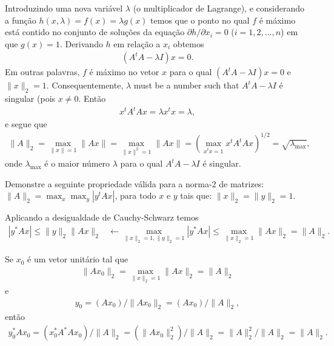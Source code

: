 \begin{questions}
\begin{solution}
        Introduzindo uma nova vari\'{a}vel $\lambda$ (o multiplicador de Lagrange), e considerando a fun\c{c}\~{a}o $h(x, \lambda) = f(x) = \lambda g(x)$ temos que o ponto no qual $f$ \'{e} m\'{a}ximo est\'{a} contido no conjunto de solu\c{c}\~{o}es da equa\c{c}\~{a}o $\partial h / \partial x_i = 0$ ($i = 1, 2, \ldots, n$) em que $g(x) = 1$. Derivando $h$ em rela\c{c}\~{a}o a $x_i$ obtemos
        \begin{align*}
            \left( A^t A - \lambda I \right) x = 0.
        \end{align*}
        Em outras palavras, $f$ \'{e} m\'{a}ximo no vetor $x$ para o qual $\left( A^t A - \lambda I \right) x = 0$  e $\| x \|_2 = 1$. Consequentemente, $\lambda$ must be a number such that $A^t A - \lambda I$ \'{e} singular (pois $x \neq 0$. Ent\~{a}o
        \begin{align*}
            x^t A^t A x = \lambda x^t x = \lambda,
        \end{align*}
        e segue que
        \begin{align*}
            \| A \|_2 = \max_{\| x \| = 1} \| A x \| = \max_{\| x \|^2 = 1} \| A x \| = \left( \max_{x^t x = 1} x^t A^t A x \right)^{1 / 2} = \sqrt{\lambda_{\max}},
        \end{align*}
        onde $\lambda_{\max}$ \'{e} o maior n\'{u}mero $\lambda$ para o qual $A^t A - \lambda I$ \'{e} singular.
    \end{solution}

     Demonstre a seguinte propriedade v\'{a}lida para a norma-2 de matrizes: $\| A \|_2 = \max_x \max_y | y^t A x |$, para todo $x$ e $y$ tais que: $\| x \|_2 = \| y \|_2 = 1$.
    \begin{solution}
        Aplicando a desigualdade de Cauchy-Schwarz temos
        \begin{align*}
            | y^* A x | \leq \| y \|_2 \| A x \|_2 &\leftarrow \max_{\| x \|_2 = 1, \| y \|_2 = 1} | y^* A x | \leq \max_{\| x \|_2 = 1} \| A x \|_2 = \| A \|_2.
        \end{align*}

        Se $x_0$ \'{e} um vetor unit\'{a}rio tal que
        \begin{align*}
            \| A x_0 \|_2 = \max_{\| x \|_2 = 1} \| A x \|_2 = \| A \|_2
        \end{align*}
        e
        \begin{align*}
            y_0 = \left( A x_0 \right) / \| A x_0 \|_2 = \left( A x_0 \right) / \| A \|_2,
        \end{align*}
        ent\~{a}o
        \begin{align*}
            y_0^* A x_0 = \left( x_0^* A^* A x_0 \right) / \| A \|_2 = \left( \| A x_0 \|_2^2 \right) / \| A \|_2 = \| A \|_2^2 / \| A \|_2 = \| A \|_2.
        \end{align*}
    \end{solution}


\end{questions}
